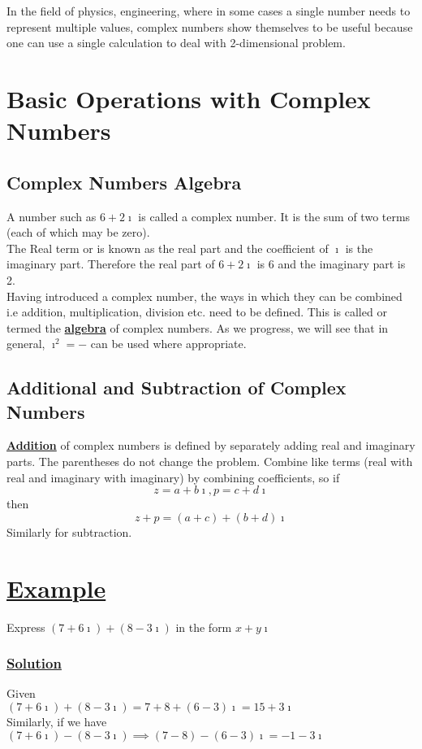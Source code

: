 \documentclass[12pt]{report}
\newcommand{\ubt}[1]{\textbf{\underline{#1}}}
\newcommand{\NI}{\noindent}
\newcommand{\imaginary}{\imath}
\newcommand{\example}[1]{\section*{\ubt{Example #1}}}
\newcommand{\solution}{\subsubsection{\ubt{Solution}}}
\begin{document}
	\NI In the field of physics, engineering, where in some cases a single number needs to represent multiple values, complex numbers show themselves to be useful because one can use a single calculation to deal with 2-dimensional problem.
	
	\section{Basic Operations with Complex Numbers}
	\subsection{Complex Numbers Algebra}
	A number such as $6+2\imaginary$ is called a complex number. It is the sum of two terms (each of which may be zero).\\
	
	\NI The Real term or is known as the real part and the coefficient of $\imaginary$ is the imaginary part. Therefore the real part of $6+2\imaginary$ is 6 and the imaginary part is 2.\\
	
	\NI Having introduced a complex number, the ways in which they can be combined i.e addition, multiplication, division etc. need to be defined. This is called or termed the \ubt{algebra} of complex numbers. As we progress, we will see that in general, $\imaginary^2 = -$ can be used where appropriate.
	
	\subsection{Additional and Subtraction of Complex Numbers}
	\ubt{Addition} of complex numbers is defined by separately adding real and imaginary parts. The parentheses do not change the problem. Combine like terms (real with real and imaginary with imaginary) by combining coefficients, so if
	\begin{equation}
		z=a+b\imaginary, p=c+d\imaginary\label{eq:1_11}
	\end{equation}
	then
	\begin{equation}
		z+p = (a+c) + (b+d)\imaginary\label{eq:1_12}
	\end{equation}
	Similarly for subtraction.
	\example{}
	Express $(7+6\imaginary) + (8-3\imaginary)$ in the form $x+y\imaginary$
	\solution
	Given\\
	$(7+6\imaginary) + (8-3\imaginary) = 7+8+(6-3)\imaginary = 15+3\imaginary$\\
	Similarly, if we have\\
	$(7+6\imaginary) - (8-3\imaginary)\implies (7-8) - (6-3)\imaginary = -1-3\imaginary$
	
\end{document}

